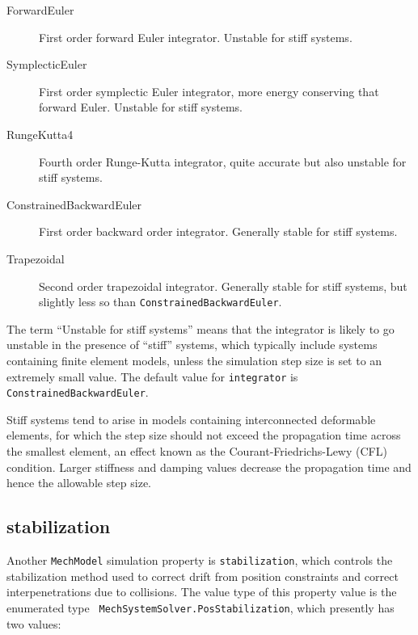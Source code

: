 \begin{description}

\item[ForwardEuler]\mbox{}

First order forward Euler integrator. Unstable for stiff systems.

\item[SymplecticEuler]\mbox{}

First order symplectic Euler integrator, more energy conserving
that forward Euler. Unstable for stiff systems.

\item[RungeKutta4]\mbox{}

Fourth order Runge-Kutta integrator, quite accurate but also unstable
for stiff systems.

\item[ConstrainedBackwardEuler]\mbox{}

First order backward order integrator. Generally stable for stiff systems.

\item[Trapezoidal]\mbox{}

Second order trapezoidal integrator. Generally stable for stiff
systems, but slightly less so than\pdfbreak
{\tt ConstrainedBackwardEuler}.

\end{description}

The term ``Unstable for stiff systems'' means that the integrator is
likely to go unstable in the presence of ``stiff'' systems, which
typically include systems containing finite element models, unless the
simulation step size is set to an extremely small value.  The default
value for {\tt integrator} is {\tt ConstrainedBackwardEuler}.

\begin{sideblock}
Stiff systems tend to arise in models containing interconnected
deformable elements, for which the step size should not exceed the
propagation time across the smallest element, an effect known as the
Courant-Friedrichs-Lewy (CFL) condition. Larger stiffness and damping
values decrease the propagation time and hence the allowable step
size.
\end{sideblock}

\subsection{stabilization}

Another {\tt MechModel} simulation property is {\tt stabilization},
which controls the stabilization method used to correct drift from
position constraints and correct interpenetrations due to collisions.
The value type of this property value is the enumerated type {\tt
MechSystemSolver.PosStabilization}, which presently has two values:

